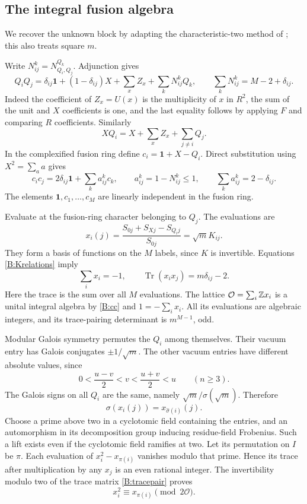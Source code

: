 \documentclass[11pt]{article}
\newcommand{\one}{\mathbf1}\newcommand{\D}{\mathcal D}\newcommand{\Dcat}{\mathcal D}
\numberwithin{equation}{section}
\begin{document}
\subsection{The integral fusion algebra}\label{B:sec:metric}
We recover the unknown block by adapting the characteristic-two method of \cite[Section~5.2]{B:GSY}; this also treats square $m$.

Write $N_{ij}^k=N_{Q_i,Q_j}^{Q_k}$. Adjunction gives
\begin{equation}\label{B:QQ}
 Q_iQ_j=\delta_{ij}\one+(1-\delta_{ij})X+\sum_x Z_x+\sum_k N_{ij}^kQ_k,
 \qquad \sum_kN_{ij}^k=M-2+\delta_{ij}.
\end{equation}
Indeed the coefficient of $Z_x=U(x)$ is the multiplicity of $x$ in $R^2$, the sum of the unit and $X$ coefficients is one, and the last equality follows by applying $F$ and comparing $R$ coefficients. Similarly
\[
 XQ_i=X+\sum_x Z_x+\sum_{j\ne i}Q_j.
\]
In the complexified fusion ring define $c_i=\one+X-Q_i$. Direct substitution using $X^2=\sum_a a$ gives
\begin{equation}\label{B:cc}
 c_ic_j=2\delta_{ij}\one+\sum_k a_{ij}^kc_k,\qquad
 a_{ij}^k=1-N_{ij}^k\leq1,\qquad \sum_k a_{ij}^k=2-\delta_{ij}.
\end{equation}
The elements $\one,c_1,\ldots,c_M$ are linearly independent in the fusion ring.

Evaluate at the fusion-ring character belonging to $Q_j$. The evaluations are
\[
 x_i(j)=\frac{S_{0j}+S_{Xj}-S_{Q_i j}}{S_{0j}}=\sqrt m K_{ij}.
\]
They form a basis of functions on the $M$ labels, since $K$ is invertible. Equations \eqref{B:Krelations} imply
\begin{equation}\label{B:tracepair}
 \sum_i x_i=-1,\qquad
 \operatorname{Tr}(x_ix_j)=m\delta_{ij}-2.
\end{equation}
Here the trace is the sum over all $M$ evaluations. The lattice $\mathcal O=\sum_i\mathbb Z x_i$ is a unital integral algebra by \eqref{B:cc} and $1=-\sum_i x_i$. All its evaluations are algebraic integers, and its trace-pairing determinant is $m^{M-1}$, odd.

Modular Galois symmetry \cite[Theorem 10.1]{B:ENO} permutes the $Q_i$ among themselves. Their vacuum entry has Galois conjugates $\pm1/\sqrt m$. The other vacuum entries have different absolute values, since
\[
 0<\frac{u-v}{2}<v<\frac{u+v}{2}<u
 \qquad(n\geq3).
\] The Galois signs on all $Q_i$ are the same, namely $\sqrt m/\sigma(\sqrt m)$. Therefore
\[
 \sigma(x_i(j))=x_{\widehat\sigma(i)}(j).
\]
Choose a prime above two in a cyclotomic field containing the entries, and an automorphism in its decomposition group inducing residue-field Frobenius. Such a lift exists even if the cyclotomic field ramifies at two. Let its permutation on $I$ be $\pi$. Each evaluation of $x_i^2-x_{\pi(i)}$ vanishes modulo that prime. Hence its trace after multiplication by any $x_j$ is an even rational integer. The invertibility modulo two of the trace matrix \eqref{B:tracepair} proves
\begin{equation}\label{B:frobenius}
 x_i^2\equiv x_{\pi(i)}\pmod{2\mathcal O}.
\end{equation}
\end{document}
